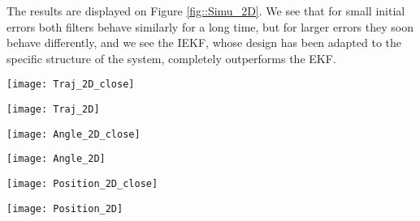 \documentclass[a4paper,12pt,onecolumn]{article}
\begin{document}
The results are displayed on Figure \ref{fig::Simu_2D}. We see that for small initial errors both filters behave similarly for a long time, but for larger errors they soon behave differently, and we see  the IEKF, whose design has been adapted to the specific structure of the system, completely outperforms the EKF.



\begin{figure*}[!h]
  \centering
\begin{minipage}[b][]{0.49\linewidth}\noindent
\texttt{[image: Traj\_2D\_close]}
\end{minipage}
\begin{minipage}[b][]{0.49\linewidth}\noindent
\texttt{[image: Traj\_2D]}
\end{minipage}
\begin{minipage}[b][]{0.49\linewidth}
\texttt{[image: Angle\_2D\_close]}
\end{minipage}
\begin{minipage}[b][]{0.49\linewidth}
\texttt{[image: Angle\_2D]}
\end{minipage}
\begin{minipage}[b][]{0.49\linewidth}\noindent
\texttt{[image: Position\_2D\_close]}
\end{minipage}
\begin{minipage}[b][]{0.49\linewidth}\noindent
\texttt{[image: Position\_2D]}
\end{minipage}
  \caption{The heading and position of the car are estimated through EKF and IEKF with high rate odometry and low rate GPS measurements. Top plots illustrate the experimental setting and display the estimated trajectories, middle plots display the heading errors and bottom plots the position errors. As the starting point is assumed known in this simulation, the initial values of the latter are zero. But it increases afterwards due to initial heading error.
\textbf{Left column:} small initial angle error (1). We see EKF and IEKF behave similarly (at least for a long time) as propagation steps are identical. \textbf{Right column:} large initial angle error (45). The behaviors rapidly become different, and the EKF is  outperformed. Due to its righteous use of the system's non-linearities, the IEKF keeps ensuring rapid estimation error decrease.
}
\label{fig::Simu_2D}
\end{figure*}
\end{document}

